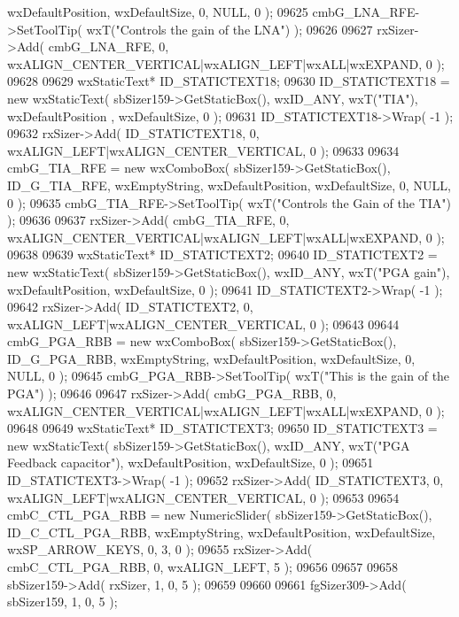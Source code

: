 \begin{DoxyCode}
      wxDefaultPosition, wxDefaultSize, 0, NULL, 0 ); 
09625     cmbG_LNA_RFE->SetToolTip( wxT(\textcolor{stringliteral}{"Controls the gain of the LNA"}) );
09626     
09627     rxSizer->Add( cmbG_LNA_RFE, 0, wxALIGN\_CENTER\_VERTICAL|wxALIGN\_LEFT|wxALL|wxEXPAND, 0 );
09628     
09629     wxStaticText* ID\_STATICTEXT18;
09630     ID\_STATICTEXT18 = \textcolor{keyword}{new} wxStaticText( sbSizer159->GetStaticBox(), wxID\_ANY, wxT(\textcolor{stringliteral}{"TIA"}), wxDefaultPosition
      , wxDefaultSize, 0 );
09631     ID\_STATICTEXT18->Wrap( -1 );
09632     rxSizer->Add( ID\_STATICTEXT18, 0, wxALIGN\_LEFT|wxALIGN\_CENTER\_VERTICAL, 0 );
09633     
09634     cmbG_TIA_RFE = \textcolor{keyword}{new} wxComboBox( sbSizer159->GetStaticBox(), ID_G_TIA_RFE, wxEmptyString, 
      wxDefaultPosition, wxDefaultSize, 0, NULL, 0 ); 
09635     cmbG_TIA_RFE->SetToolTip( wxT(\textcolor{stringliteral}{"Controls the Gain of the TIA"}) );
09636     
09637     rxSizer->Add( cmbG_TIA_RFE, 0, wxALIGN\_CENTER\_VERTICAL|wxALIGN\_LEFT|wxALL|wxEXPAND, 0 );
09638     
09639     wxStaticText* ID\_STATICTEXT2;
09640     ID\_STATICTEXT2 = \textcolor{keyword}{new} wxStaticText( sbSizer159->GetStaticBox(), wxID\_ANY, wxT(\textcolor{stringliteral}{"PGA gain"}), 
      wxDefaultPosition, wxDefaultSize, 0 );
09641     ID\_STATICTEXT2->Wrap( -1 );
09642     rxSizer->Add( ID\_STATICTEXT2, 0, wxALIGN\_LEFT|wxALIGN\_CENTER\_VERTICAL, 0 );
09643     
09644     cmbG_PGA_RBB = \textcolor{keyword}{new} wxComboBox( sbSizer159->GetStaticBox(), ID_G_PGA_RBB, wxEmptyString, 
      wxDefaultPosition, wxDefaultSize, 0, NULL, 0 ); 
09645     cmbG_PGA_RBB->SetToolTip( wxT(\textcolor{stringliteral}{"This is the gain of the PGA"}) );
09646     
09647     rxSizer->Add( cmbG_PGA_RBB, 0, wxALIGN\_CENTER\_VERTICAL|wxALIGN\_LEFT|wxALL|wxEXPAND, 0 );
09648     
09649     wxStaticText* ID\_STATICTEXT3;
09650     ID\_STATICTEXT3 = \textcolor{keyword}{new} wxStaticText( sbSizer159->GetStaticBox(), wxID\_ANY, wxT(\textcolor{stringliteral}{"PGA Feedback capacitor"}),
       wxDefaultPosition, wxDefaultSize, 0 );
09651     ID\_STATICTEXT3->Wrap( -1 );
09652     rxSizer->Add( ID\_STATICTEXT3, 0, wxALIGN\_LEFT|wxALIGN\_CENTER\_VERTICAL, 0 );
09653     
09654     cmbC_CTL_PGA_RBB = \textcolor{keyword}{new} NumericSlider( sbSizer159->GetStaticBox(), 
      ID_C_CTL_PGA_RBB, wxEmptyString, wxDefaultPosition, wxDefaultSize, wxSP\_ARROW\_KEYS, 0, 3, 0 );
09655     rxSizer->Add( cmbC_CTL_PGA_RBB, 0, wxALIGN\_LEFT, 5 );
09656     
09657     
09658     sbSizer159->Add( rxSizer, 1, 0, 5 );
09659     
09660     
09661     fgSizer309->Add( sbSizer159, 1, 0, 5 );

\end{DoxyCode}
